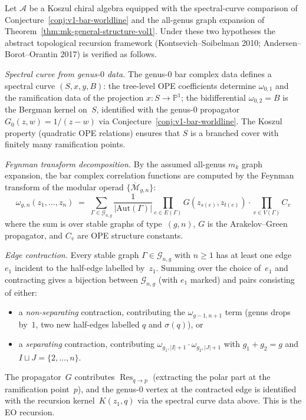 \begin{remark}
Let $\mathcal{A}$ be a Koszul chiral algebra equipped with the
spectral-curve comparison of
Conjecture~\ref{conj:v1-bar-worldline} and the all-genus graph
expansion of Theorem~\ref{thm:mk-general-structure-vol1}. Under
these two hypotheses the abstract topological recursion framework
(Kontsevich--Soibelman 2010; Andersen--Borot--Orantin 2017) is
verified as follows.

\emph{Spectral curve from genus-$0$ data.}
The genus-$0$ bar complex data defines a spectral curve
$(S, x, y, B)$: the tree-level OPE coefficients determine
$\omega_{0,1}$ and the ramification data of the projection
$x\colon S \to \mathbb{P}^1$; the bidifferential
$\omega_{0,2} = B$ is the Bergman kernel on~$S$, identified with
the genus-$0$ propagator $G_0(z,w) = 1/(z-w)$ via
Conjecture~\ref{conj:v1-bar-worldline}. The Koszul property (quadratic
OPE relations) ensures that $S$ is a branched cover with finitely
many ramification points.

\emph{Feynman transform decomposition.}
By the assumed all-genus $m_k$ graph expansion, the bar complex
correlation functions are computed by the Feynman transform of the
modular operad $\{\overline{\mathcal{M}}_{g,n}\}$:
\[
\omega_{g,n}(z_1, \ldots, z_n) \;=\; \sum_{\Gamma \in \mathcal{G}_{n,g}}
\frac{1}{|\mathrm{Aut}(\Gamma)|}
\prod_{e \in E(\Gamma)} G(z_{s(e)}, z_{t(e)})
\cdot \prod_{v \in V(\Gamma)} C_v
\]
where the sum is over stable graphs of type~$(g,n)$,
$G$ is the Arakelov--Green propagator, and $C_v$ are OPE structure
constants.

\emph{Edge contraction.}
Every stable graph $\Gamma \in \mathcal{G}_{n,g}$ with $n \geq 1$
has at least one edge~$e_1$ incident to the half-edge labelled by~$z_1$.
Summing over the choice of~$e_1$ and contracting gives a bijection
between $\mathcal{G}_{n,g}$ (with $e_1$ marked) and pairs consisting
of either:
\begin{itemize}
\item a \emph{non-separating} contraction, contributing the
 $\omega_{g-1,n+1}$ term (genus drops by~$1$, two new
 half-edges labelled $q$ and $\sigma(q)$), or
\item a \emph{separating} contraction, contributing
 $\omega_{g_1,|I|+1} \cdot \omega_{g_2,|J|+1}$ with
 $g_1+g_2 = g$ and $I \sqcup J = \{2,\ldots,n\}$.
\end{itemize}
The propagator~$G$ contributes $\operatorname{Res}_{q \to p}$
(extracting the polar part at the ramification point~$p$), and
the genus-$0$ vertex at the contracted edge is identified with the
recursion kernel~$K(z_1, q)$ via the spectral curve data above.
This is the EO recursion.


\end{remark}
